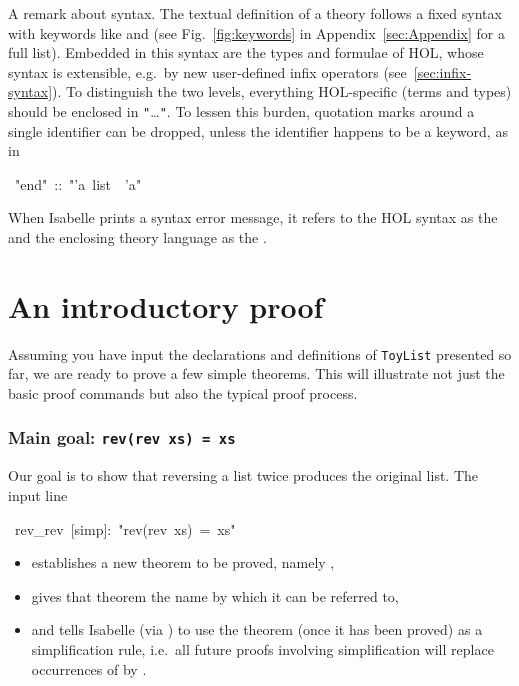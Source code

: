 \begin{isabelle}
\begin{isamarkuptext}
A remark about syntax.  The textual definition of a theory follows a fixed
syntax with keywords like  and  (see
Fig.~\ref{fig:keywords} in Appendix~\ref{sec:Appendix} for a full list).
Embedded in this syntax are the types and formulae of HOL, whose syntax is
extensible, e.g.\ by new user-defined infix operators
(see~\ref{sec:infix-syntax}). To distinguish the two levels, everything
HOL-specific (terms and types) should be enclosed in
\texttt{"}\dots\texttt{"}. 
To lessen this burden, quotation marks around a single identifier can be
dropped, unless the identifier happens to be a keyword, as in%
\end{isamarkuptext}%
~{"}end{"}~::~{"}'a~list~{\isasymRightarrow}~'a{"}%
\begin{isamarkuptext}%
\noindent
When Isabelle prints a syntax error message, it refers to the HOL syntax as
the  and the enclosing theory language as the .


\section{An introductory proof}
\label{sec:intro-proof}

Assuming you have input the declarations and definitions of \texttt{ToyList}
presented so far, we are ready to prove a few simple theorems. This will
illustrate not just the basic proof commands but also the typical proof
process.

\subsubsection*{Main goal: \texttt{rev(rev xs) = xs}}

Our goal is to show that reversing a list twice produces the original
list. The input line%
\end{isamarkuptext}%
~rev\_rev~[simp]:~{"}rev(rev~xs)~=~xs{"}%
\begin{isamarkuptxt}%
\begin{itemize}
\item
establishes a new theorem to be proved, namely ,
\item
gives that theorem the name  by which it can be referred to,
\item
and tells Isabelle (via \isa{[simp]}) to use the theorem (once it has been
proved) as a simplification rule, i.e.\ all future proofs involving
simplification will replace occurrences of  by
.


\end{itemize}
\end{isamarkuptxt}
\end{isabelle}
